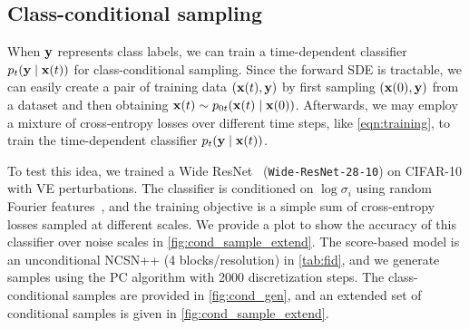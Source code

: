 \subsection{Class-conditional sampling}\label{app:class_cond_sampling}
When $\mathbf{y}$ represents class labels, we can train a time-dependent classifier $p_t(\mathbf{y} \mid \mathbf{x}(t))$ for class-conditional sampling. Since the forward SDE is tractable, we can easily create a pair of training data $(\mathbf{x}(t), \mathbf{y})$ by first sampling $(\mathbf{x}(0), \mathbf{y})$ from a dataset and then obtaining $\mathbf{x}(t) \sim p_{0t}(\mathbf{x}(t) \mid \mathbf{x}(0))$. Afterwards, we may employ a mixture of cross-entropy losses over different time steps, like \cref{eqn:training}, to train the time-dependent classifier $p_t(\mathbf{y} \mid \mathbf{x}(t))$.

To test this idea, we trained a Wide ResNet~\citep{zagoruyko2016wide} (\verb|Wide-ResNet-28-10|) on CIFAR-10 with VE perturbations. The classifier is conditioned on $\log \sigma_i$ using random Fourier features~\citep{tancik2020fourfeat}, and the training objective is a simple sum of cross-entropy losses sampled at different scales. We provide a plot to show the accuracy of this classifier over noise scales in \cref{fig:cond_sample_extend}. The score-based model is an unconditional NCSN++ (4 blocks/resolution) in \cref{tab:fid}, and we generate samples using the PC algorithm with 2000 discretization steps. The class-conditional samples are provided in \cref{fig:cond_gen}, and an extended set of conditional samples is given in \cref{fig:cond_sample_extend}.
